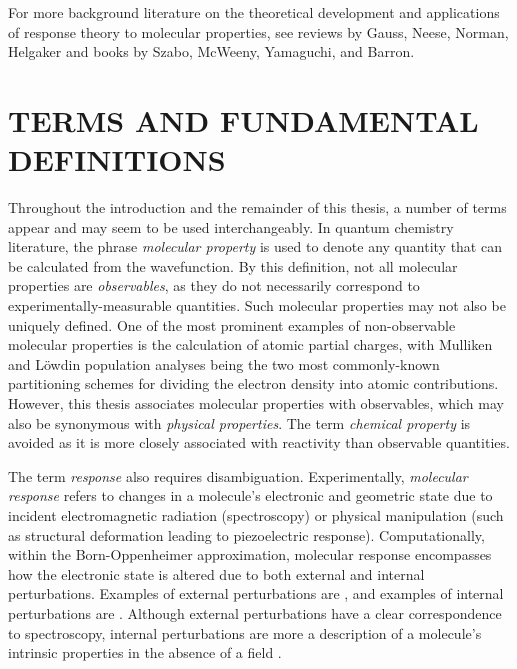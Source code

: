 \documentclass[%
class = book,%
crop = false,%
float = true,%
multi = true,%
preview = false,%
]{standalone}
\let\cite\autocite
\newcommand{\caps}[1]{\uppercase{#1}}
\begin{document}
For more background literature on the theoretical development and applications of response theory to molecular properties, see reviews by Gauss\cite{gauss2000}, Neese\cite{NEESE2009526}, Norman\cite{C1CP21951K}, Helgaker\cite{doi:10.1021/cr2002239} and books by Szabo\cite{szabo1989modern}, McWeeny\cite{mcweeny1989methods}, Yamaguchi\cite{Yamaguchi1994}, and Barron\cite{barron2004molecular}.

\section{\texorpdfstring{\caps{Terms and Fundamental Definitions}}{Terms and Fundamental Definitions}}

Throughout the introduction and the remainder of this thesis, a number of terms appear and may seem to be used interchangeably. In quantum chemistry literature, the phrase \emph{molecular property} is used to denote any quantity that can be calculated from the wavefunction. By this definition, not all molecular properties are \emph{observables}, as they do not necessarily correspond to experimentally-measurable quantities. Such molecular properties may not also be uniquely defined. One of the most prominent examples of non-observable molecular properties is the calculation of atomic partial charges, with Mulliken and L{\"{o}}wdin population analyses being the two most commonly-known partitioning schemes for dividing the electron density into atomic contributions. However, this thesis associates molecular properties with observables, which may also be synonymous with \emph{physical properties}. The term \emph{chemical property} is avoided as it is more closely associated with reactivity than observable quantities.

The term \emph{response} also requires disambiguation. Experimentally, \emph{molecular response} refers to changes in a molecule's electronic and geometric state due to incident electromagnetic radiation (spectroscopy) or physical manipulation (such as structural deformation leading to piezoelectric response)\cite{doi:10.1021/jz400355v,doi:10.1021/jp412740j,doi:10.1021/acs.jpcb.7b10085}. Computationally, within the Born-Oppenheimer approximation, molecular response encompasses how the electronic state is altered due to both external and internal perturbations. Examples of external perturbations are , and examples of internal perturbations are . Although external perturbations have a clear correspondence to spectroscopy, internal perturbations are more a description of a molecule's intrinsic properties in the absence of a field .
\end{document}
